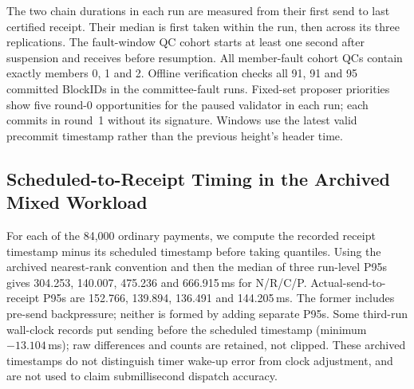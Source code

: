 The two chain durations in each run are measured from their first send to last certified receipt. Their median is first taken within the run, then across its three replications. The fault-window QC cohort starts at least one second after suspension and receives before resumption. All member-fault cohort QCs contain exactly members 0, 1 and 2. Offline verification checks all 91, 91 and 95 committed BlockIDs in the committee-fault runs. Fixed-set proposer priorities show five round-0 opportunities for the paused validator in each run; each commits in round~1 without its signature. Windows use the latest valid precommit timestamp rather than the previous height's header time.

\subsection{Scheduled-to-Receipt Timing in the Archived Mixed Workload}
For each of the 84,000 ordinary payments, we compute the recorded receipt timestamp minus its scheduled timestamp before taking quantiles. Using the archived nearest-rank convention and then the median of three run-level P95s gives 304.253, 140.007, 475.236 and 666.915\,ms for N/R/C/P. Actual-send-to-receipt P95s are 152.766, 139.894, 136.491 and 144.205\,ms. The former includes pre-send backpressure; neither is formed by adding separate P95s. Some third-run wall-clock records put sending before the scheduled timestamp (minimum $-13.104$\,ms); raw differences and counts are retained, not clipped. These archived timestamps do not distinguish timer wake-up error from clock adjustment, and are not used to claim submillisecond dispatch accuracy.
